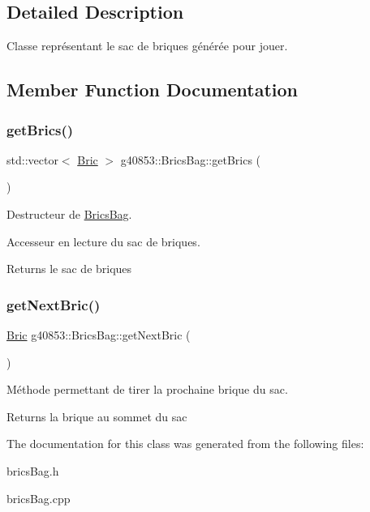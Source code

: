 \subsection{Detailed Description}
Classe représentant le sac de briques générée pour jouer. 

\subsection{Member Function Documentation}
\hypertarget{classg40853_1_1_brics_bag_a6c7ba16482e721bfdc2cfe7490a22cc6}{}\label{classg40853_1_1_brics_bag_a6c7ba16482e721bfdc2cfe7490a22cc6} 
\subsubsection{\texorpdfstring{get\+Brics()}{getBrics()}}
{\footnotesize\ttfamily std\+::vector$<$ \hyperlink{classg40853_1_1_bric}{Bric} $>$ g40853\+::\+Brics\+Bag\+::get\+Brics (\begin{DoxyParamCaption}{ }\end{DoxyParamCaption})\hspace{0.3cm}{\ttfamily [inline]}}



Destructeur de \hyperlink{classg40853_1_1_brics_bag}{Brics\+Bag}. 

Accesseur en lecture du sac de briques.

\begin{DoxyReturn}{Returns}
le sac de briques 
\end{DoxyReturn}
\hypertarget{classg40853_1_1_brics_bag_a32ccd6c47957ea18ab79d7e745e5feab}{}\label{classg40853_1_1_brics_bag_a32ccd6c47957ea18ab79d7e745e5feab} 
\subsubsection{\texorpdfstring{get\+Next\+Bric()}{getNextBric()}}
{\footnotesize\ttfamily \hyperlink{classg40853_1_1_bric}{Bric} g40853\+::\+Brics\+Bag\+::get\+Next\+Bric (\begin{DoxyParamCaption}{ }\end{DoxyParamCaption})\hspace{0.3cm}{\ttfamily [inline]}}



Méthode permettant de tirer la prochaine brique du sac. 

\begin{DoxyReturn}{Returns}
la brique au sommet du sac 
\end{DoxyReturn}


The documentation for this class was generated from the following files\+:\begin{DoxyCompactItemize}
\item 
brics\+Bag.\+h\item 
brics\+Bag.\+cpp\end{DoxyCompactItemize}
